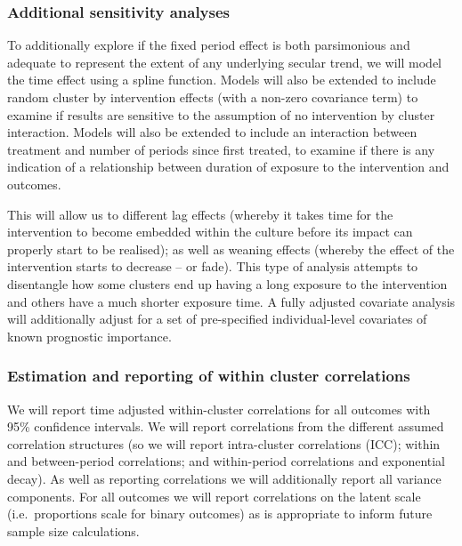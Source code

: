 \documentclass[
]{scrartcl}
\begin{document}
\hypertarget{additional-sensitivity-analyses}{%
\subsubsection{Additional sensitivity
analyses}\label{additional-sensitivity-analyses}}

To additionally explore if the fixed period effect is both parsimonious
and adequate to represent the extent of any underlying secular trend, we
will model the time effect using a spline function. Models will also be
extended to include random cluster by intervention effects (with a
non-zero covariance term) to examine if results are sensitive to the
assumption of no intervention by cluster interaction. Models will also
be extended to include an interaction between treatment and number of
periods since first treated, to examine if there is any indication of a
relationship between duration of exposure to the intervention and
outcomes.

This will allow us to different lag effects (whereby it takes time for
the intervention to become embedded within the culture before its impact
can properly start to be realised); as well as weaning effects (whereby
the effect of the intervention starts to decrease -- or fade). This type
of analysis attempts to disentangle how some clusters end up having a
long exposure to the intervention and others have a much shorter
exposure time. A fully adjusted covariate analysis will additionally
adjust for a set of pre-specified individual-level covariates of known
prognostic importance.

\hypertarget{estimation-and-reporting-of-within-cluster-correlations}{%
\subsubsection{Estimation and reporting of within cluster
correlations}\label{estimation-and-reporting-of-within-cluster-correlations}}

We will report time adjusted within-cluster correlations for all
outcomes with 95\% confidence intervals. We will report correlations
from the different assumed correlation structures (so we will report
intra-cluster correlations (ICC); within and between-period
correlations; and within-period correlations and exponential decay). As
well as reporting correlations we will additionally report all variance
components. For all outcomes we will report correlations on the latent
scale (i.e.~proportions scale for binary outcomes) as is appropriate to
inform future sample size calculations.
\end{document}
